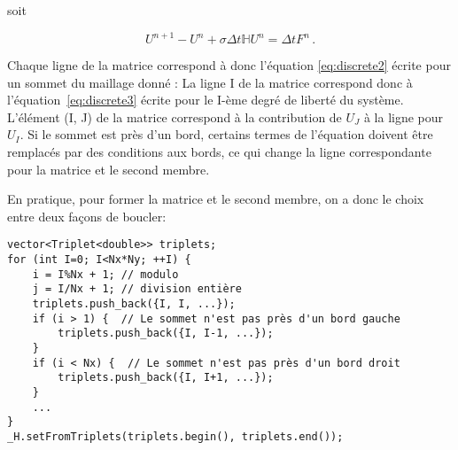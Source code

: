 \documentclass[11pt]{article}
\begin{document}

soit

\begin{equation}
U^{n+1} - U^{n} + \sigma\Delta t \mathbb{H} U^{n} = \Delta t F^{n} \,.
\end{equation}

Chaque ligne de la matrice correspond à donc l'équation \ref{eq:discrete2} écrite pour un sommet du maillage donné : La ligne I de la matrice correspond donc à l'équation~\ref{eq:discrete3} écrite pour le I-ème degré de liberté du système. L'élément (I, J) de la matrice correspond à la contribution de $U_J$ à la ligne pour $U_I$. Si le sommet est près d'un bord, certains termes de l'équation doivent être remplacés par des conditions aux bords, ce qui change la ligne correspondante pour la matrice et le second membre.


\bigskip


En pratique, pour former la matrice et le second membre, on a donc le choix entre deux façons de boucler:

\begin{Verbatim}
vector<Triplet<double>> triplets;
for (int I=0; I<Nx*Ny; ++I) {
    i = I%Nx + 1; // modulo
    j = I/Nx + 1; // division entière
    triplets.push_back({I, I, ...});
    if (i > 1) {  // Le sommet n'est pas près d'un bord gauche
        triplets.push_back({I, I-1, ...});
    }
    if (i < Nx) {  // Le sommet n'est pas près d'un bord droit
        triplets.push_back({I, I+1, ...});
    } 
    ...
}
_H.setFromTriplets(triplets.begin(), triplets.end());
\end{Verbatim}
\end{document}
